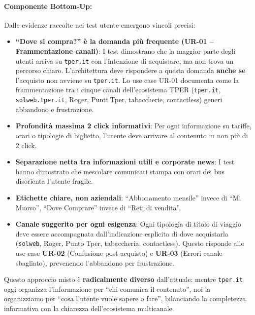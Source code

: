\begin{tcolorbox}[colback=backgroundColor,colframe=borderColor,arc=2mm]
{\paragraph{Componente Bottom-Up:} Dalle evidenze raccolte nei test utente emergono vincoli precisi:
\begin{itemize}
 \item \textbf{``Dove si compra?'' è la domanda più frequente (UR-01 -- Frammentazione canali)}: I test dimostrano che la maggior parte degli utenti arriva su \texttt{tper.it} con l'intenzione di acquistare, ma non trova un percorso chiaro. L'architettura deve rispondere a questa domanda \textbf{anche se} l'acquisto non avviene su \texttt{tper.it}. Lo use case UR-01 documenta come la frammentazione tra i cinque canali dell'ecosistema TPER (\texttt{tper.it}, \texttt{solweb.tper.it}, Roger, Punti Tper, tabaccherie, contactless) generi abbandono e frustrazione.
 \item \textbf{Profondità massima 2 click informativi}: Per ogni informazione su tariffe, orari o tipologie di biglietto, l'utente deve arrivare al contenuto in non più di 2 click.
 \item \textbf{Separazione netta tra informazioni utili e corporate news}: I test hanno dimostrato che mescolare comunicati stampa con orari dei bus disorienta l'utente fragile.
 \item \textbf{Etichette chiare, non aziendali}: ``Abbonamento mensile'' invece di ``Mi Muovo'', ``Dove Comprare'' invece di ``Reti di vendita''.
 \item \textbf{Canale suggerito per ogni esigenza}: Ogni tipologia di titolo di viaggio deve essere accompagnata dall'indicazione esplicita di dove acquistarla (\texttt{solweb}, Roger, Punto Tper, tabaccheria, contactless). Questo risponde allo use case \textbf{UR-02} (Confusione post-acquisto) e \textbf{UR-03} (Errori canale sbagliato), prevenendo l'abbandono per frustrazione.
\end{itemize}

\noindent Questo approccio misto è \textbf{radicalmente diverso} dall'attuale: mentre \texttt{tper.it} oggi organizza l'informazione per ``chi comunica il contenuto'', noi la organizziamo per ``cosa l'utente vuole sapere o fare'', bilanciando la completezza informativa con la chiarezza dell'ecosistema multicanale.
}
\end{tcolorbox}

\vspace{0.5cm}

